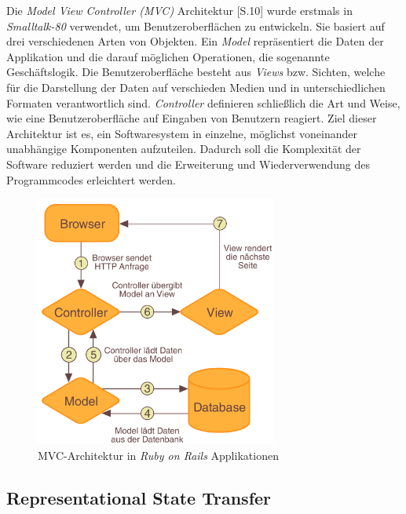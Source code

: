Die \textit{Model View Controller (MVC)} Architektur
\cite{Gamma95Design}[S.10] wurde erstmals in \textit{Smalltalk-80}
verwendet, um Benutzeroberflächen zu entwickeln. Sie basiert auf drei
verschiedenen Arten von Objekten. Ein \textit{Model} repräsentiert die
Daten der Applikation und die darauf möglichen Operationen, die
sogenannte Geschäftslogik. Die Benutzeroberfläche besteht aus
\textit{Views} bzw. Sichten, welche für die Darstellung der Daten auf
verschieden Medien und in unterschiedlichen Formaten verantwortlich
sind. \textit{Controller} definieren schließlich die Art und Weise,
wie eine Benutzeroberfläche auf Eingaben von Benutzern reagiert. Ziel
dieser Architektur ist es, ein Softwaresystem in einzelne, möglichst
voneinander unabhängige Komponenten aufzuteilen. Dadurch soll die
Komplexität der Software reduziert werden und die Erweiterung und
Wiederverwendung des Programmcodes erleichtert werden.

\begin{figure}[h]
  \begin{center}
    \includegraphics[width=300px]{bilder/mvc}
    \caption{MVC-Architektur in \textit{Ruby on Rails} Applikationen}
  \end{center}
\end{figure}

\subsection{Representational State Transfer}
\label{rest}

